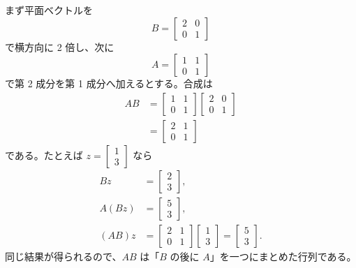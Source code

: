 \begin{example}[合成としての行列積]
まず平面ベクトルを
\begin{equation}
  B=
  \begin{bmatrix}
    2&0\\
    0&1
  \end{bmatrix}
\end{equation}
で横方向に 2 倍し、次に
\begin{equation}
  A=
  \begin{bmatrix}
    1&1\\
    0&1
  \end{bmatrix}
\end{equation}
で第 2 成分を第 1 成分へ加えるとする。合成は
\begin{align}
  AB
  &=
  \begin{bmatrix}
    1&1\\
    0&1
  \end{bmatrix}
  \begin{bmatrix}
    2&0\\
    0&1
  \end{bmatrix}\\
  &=
  \begin{bmatrix}
    2&1\\
    0&1
  \end{bmatrix}
\end{align}
である。たとえば $z=\begin{bmatrix}1\\3\end{bmatrix}$ なら
\begin{align}
  Bz&=\begin{bmatrix}2\\3\end{bmatrix},\\
  A(Bz)&=\begin{bmatrix}5\\3\end{bmatrix},\\
  (AB)z&=
  \begin{bmatrix}
    2&1\\
    0&1
  \end{bmatrix}
  \begin{bmatrix}1\\3\end{bmatrix}
  =
  \begin{bmatrix}5\\3\end{bmatrix}.
\end{align}
同じ結果が得られるので、$AB$ は「$B$ の後に $A$」を一つにまとめた行列である。
\end{example}

